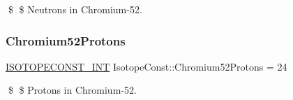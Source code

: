 \$ \$ Neutrons in Chromium-\/52. \mbox{\label{group___isotope_const-_chromium-_cr52_ga8610ff7f0199cfe9be46398785f014e5}} 
\subsubsection{\texorpdfstring{Chromium52\+Protons}{Chromium52Protons}}
{\footnotesize\ttfamily \mbox{\hyperlink{group___isotope_const-_macros_ga5f18360b3e99483a35c32d789e62621c}{I\+S\+O\+T\+O\+P\+E\+C\+O\+N\+S\+T\+\_\+\+I\+NT}} Isotope\+Const\+::\+Chromium52\+Protons = 24}

\$ \$ Protons in Chromium-\/52. 